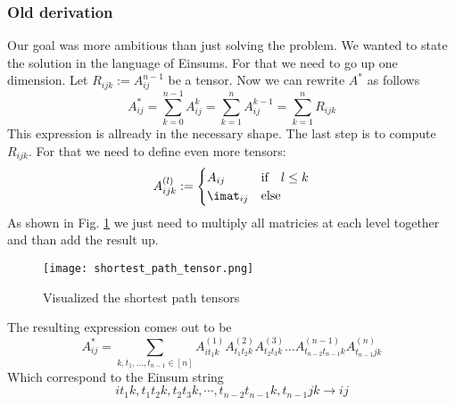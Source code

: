 \subsubsection{Old derivation}
Our goal was more ambitious than just solving the problem. We wanted to state the solution in the language of Einsums. For that we need to go up one dimension. Let $R_{ijk} := A^{n-1}_{ij}$ be a tensor. Now we can rewrite $A^*$ as follows
$$A^*_{ij} = \sum_{k=0}^{n-1} A^k_{ij} = \sum_{k=1}^{n}A^{k-1}_{ij} = \sum_{k=1}^{n}R_{ijk}$$
This expression is allready in the necessary shape. The last step is to compute $R_{ijk}$. For that we need to define even more tensors: 
$$A^{(l)}_{ijk} := 
\begin{cases}
    A_{ij} & \textrm{if}\quad l \leq k\\
    \imat_{ij} & \textrm{else}   
\end{cases}
$$
As shown in Fig. \ref*{fig:shortest_path_tensor} we just need to multiply all matricies at each level together and than add the result up.

\begin{figure}[h]
    \texttt{[image: shortest\_path\_tensor.png]}
    \caption{Visualized the shortest path tensors}
    \label{fig:shortest_path_tensor}
\end{figure}

The resulting expression comes out to be
$$A^*_{ij} = \sum_{k, t_1, \dots, t_{n-1} \in [n]} A^{(1)}_{it_1k}A^{(2)}_{t_1t_2k}A^{(3)}_{t_2t_3k}\dots A^{(n-1)}_{t_{n-2}t_{n-1}k}A^{(n)}_{t_{n-1}jk}$$
Which correspond to the Einsum string
$$it_1k, t_1t_2k, t_2t_3k, \cdots, t_{n-2}t_{n-1}k, t_{n-1}jk \to ij$$

